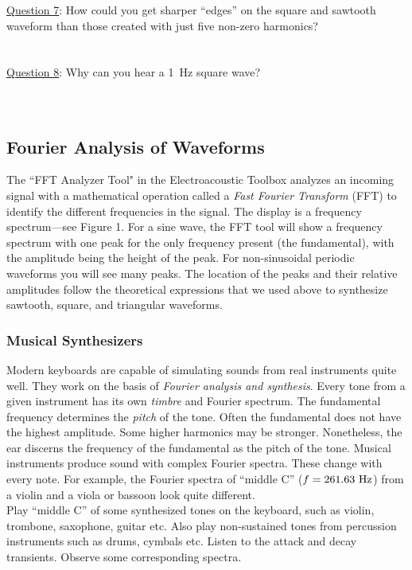 \documentclass[11pt]{NSF}
\begin{document}
\underline{Question 7}: How could you get sharper ``edges” on the square and 
sawtooth waveform than those created with just five non-zero
harmonics?
\\
\\
\\

\underline{Question 8}: Why can you hear a 1~Hz square wave?
\\
\\
\\

\subsection{Fourier Analysis of Waveforms}

The ``FFT Analyzer Tool" in the Electroacoustic Toolbox 
analyzes an incoming signal with a mathematical operation 
called a {\em Fast Fourier Transform} (FFT) to 
identify the different frequencies in the signal. 
The display is a frequency spectrum---see Figure 1.
For a sine wave, the FFT tool will show a frequency spectrum with one peak for
the only frequency present (the fundamental), 
with the amplitude being the height of the peak.
For non-sinusoidal periodic waveforms you will see many peaks.
The location of the peaks and their relative amplitudes 
follow the theoretical expressions that we used above to synthesize
sawtooth, square, and triangular waveforms.

\subsubsection{Musical Synthesizers}

Modern keyboards are capable of simulating sounds from real 
instruments quite well. 
They work on the basis of {\em Fourier analysis and synthesis}. 
Every tone from a given instrument has its own {\em timbre} 
and Fourier spectrum. 
The fundamental frequency determines the {\em pitch} of the tone. 
Often the fundamental does not have the highest amplitude. 
Some higher harmonics may be stronger. 
Nonetheless, the ear discerns the frequency of the fundamental 
as the pitch of the tone. 
Musical instruments produce sound with complex Fourier spectra. 
These change with every note. 
For example, the Fourier spectra of ``middle C” ($f = 261.63~{\rm Hz}$) 
from a violin and a viola or bassoon look quite different. \\

Play “middle C” of some synthesized tones on the keyboard, such as violin, trombone,
saxophone, guitar etc. Also play non-sustained tones from percussion instruments such as drums,
cymbals etc. Listen to the attack and decay transients. Observe some corresponding spectra. \\
\end{document}
